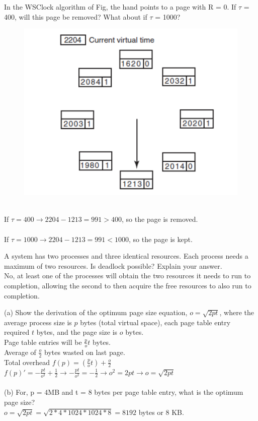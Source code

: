\documentclass[12pt]{article}
\newenvironment{problem}[2][Problem]{\begin{trivlist}
\item[\hskip \labelsep {\bfseries #1}\hskip \labelsep {\bfseries #2.}]}{\end{trivlist}}
\begin{document}
\begin{problem}{4}
  In the WSClock algorithm of Fig, the hand points to a page with R = 0. If $\tau$ = 400, will
this page be removed? What about if $\tau$ = 1000?\\
\begin{figure}[ht]
  \centering
  \includegraphics[scale=0.7]{clock}
\end{figure}
\\If $\tau = 400 \rightarrow 2204-1213 = 991 > 400$, so the page is removed.\\
\\If $\tau = 1000 \rightarrow 2204-1213 = 991 < 1000$, so the page is kept.\\
\end{problem}
\pagebreak
\begin{problem}{5}
  A system has two processes and three identical resources. Each process needs a
maximum of two resources. Is deadlock possible? Explain your answer.\\
No, at least one of the processes will obtain the two resources it needs to run to completion, allowing the second to then acquire the free resources to also run to completion.
\end{problem}

\begin{problem}{6}
  (a) Show the derivation of the optimum page size equation, $o = \sqrt{2pt}$,
where the average process size is $p$ bytes (total virtual space), each page table entry required
$t$ bytes, and the page size is $o$ bytes.\\
Page table entries will be $\frac{p}{o}t$ bytes.\\
Average of $\frac{o}{2}$ bytes wasted on last page.\\
Total overhead $f(p)= (\frac{p}{o}t) + \frac{o}{2}$\\
$f(p)' = -\frac{pt}{o^2} + \frac{1}{2} \rightarrow -\frac{pt}{o^2} = -\frac{1}{2} \rightarrow o^2 = 2pt \rightarrow o = \sqrt{2pt}$\\\\
(b) For, p = 4MB and t = 8 bytes per page table entry, what is the optimum page size?\\
$o = \sqrt{2pt} = \sqrt{2*4*1024*1024*8} = 8192$ bytes or 8 KB.
\end{problem}
\end{document}
